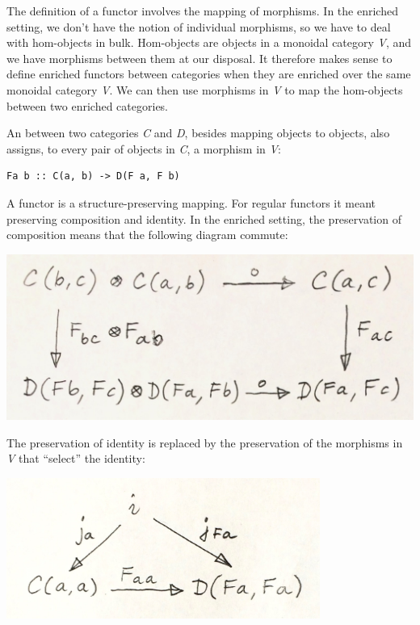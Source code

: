 The definition of a functor involves the mapping of morphisms. In the
enriched setting, we don't have the notion of individual morphisms, so
we have to deal with hom-objects in bulk. Hom-objects are objects in a
monoidal category \emph{V}, and we have morphisms between them at our
disposal. It therefore makes sense to define enriched functors between
categories when they are enriched over the same monoidal category
\emph{V}. We can then use morphisms in \emph{V} to map the hom-objects
between two enriched categories.

An   between two categories \emph{C}
and \emph{D}, besides mapping objects to objects, also assigns, to every
pair of objects in \emph{C}, a morphism in \emph{V}:

\begin{verbatim}
Fa b :: C(a, b) -> D(F a, F b)
\end{verbatim}

A functor is a structure-preserving mapping. For regular functors it
meant preserving composition and identity. In the enriched setting, the
preservation of composition means that the following diagram commute:

\includegraphics[width=5.31250in]{images/functorcomp.jpg}

The preservation of identity is replaced by the preservation of the
morphisms in \emph{V} that ``select'' the identity:

\includegraphics[width=4.04167in]{images/functorid.jpg}

